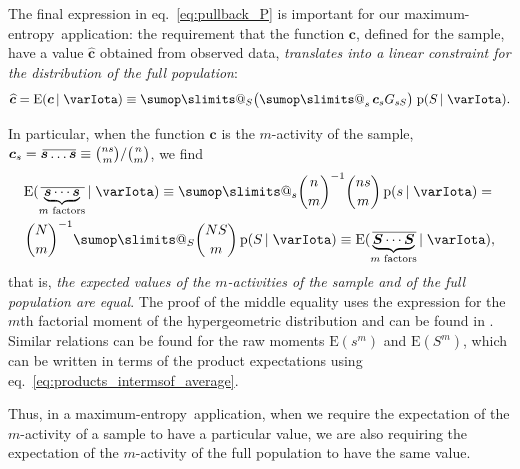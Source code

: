 \documentclass[\ifafour a4paper,12pt,\else a5paper,10pt,\fi%
onecolumn,oneside,article,%
british%
]{memoir}
\makeatletter
\theoremstyle{remark}
\theoremstyle{innote}
\def\sum{\DOTSI\sumop\slimits@}
\newcommand*{\pf}{\mathrm{p}}%
\newcommand*{\p}{\mathrm{P}}%
\newcommand*{\E}{\mathrm{E}}
\renewcommand*{\|}{\nonscript\,\vert\nonscript\;\mathopen{}}
\newcommand*{\eqn}{eq.}%
\newcommand*{\tsum}{\mathop{\textstyle\sum}\nolimits}
\newcommand*{\widebar}[1]{{\mkern1.5mu\skew{2}\overline{\mkern-1.5mu#1\mkern-1.5mu}\mkern 1.5mu}}
\newcommand*{\av}{\widebar} %
\newcommand*{\sav}{\widebar} %
\newcommand*{\ypp}{G}
\newcommand*{\yRv}{S}
\newcommand*{\yrv}{s}
\newcommand*{\yNv}{N}
\newcommand*{\yr}{\bm{\yrv}}%
\newcommand*{\yrs}{\yrv}%
\newcommand*{\yR}{\bm{\yRv}}%
\newcommand*{\yRf}{\yRv}%
\newcommand*{\yH}{\varIota}
\newcommand*{\yg}{\bm{c}}
\newcommand*{\yc}{\widehat{\bm{c}}}
\newcommand*{\me}{maximum-entropy}
\makeatother
\begin{document}
\bigskip

The final expression in \eqn~\eqref{eq:pullback_P} is important for our
\me\ application: the requirement that the function $\yg$, defined for the
sample, have a  value $\yc$ obtained from observed data,
\emph{translates into a linear constraint for the distribution of the full
  population}:
\begin{equation}
  \label{eq:constraint_extended}
  \yc = \E(\yg \| \yH) \equiv \sum_{\yRf} \bigl( \tsum_{\yrs} \yg_{\yrs}  \ypp_{\yrs\yRf} \bigr)\;
  \pf(\yRf \| \yH).
\end{equation}

In particular, when the function $\yg$ is the $m$-activity of the sample,
$\yg_{\yrs} = \sav{\yr\dotso\yr} \equiv \binom{n\yrs}{m}/\binom{n}{m}$, we
find
\begin{multline}
  \label{eq:expe_products}
  \E(\sav{\underbrace{\yr \dotsm \yr}_{\text{$m$ factors}}} \| \yH)
\equiv
    \sum_{\yrs} %
    \binom{n}{m}^{-1}
    \binom{n \yrs}{m}\, \pf(\yrs \| \yH)
    ={}\\
    \binom{\yNv}{m}^{-1}
    \sum_{\yRf} %
    \binom{\yNv \yRf}{m}\, \pf(\yRf \| \yH)
\equiv    \E(\av{\underbrace{\yR \dotsm \yR}_{\text{$m$ factors}}} \| \yH),
\end{multline}
that is, \emph{the expected values of the $m$-activities of the sample and
  of the full population are equal}. The proof of the middle equality uses
the expression for the $m$th factorial moment of the hypergeometric
distribution and can be found in \textcite{potts1953}. Similar relations
can be found for the raw moments $\E(\yrs^m)$ and $\E(\yRf^m)$, which
can be written in terms of the product expectations using
\eqn~\eqref{eq:products_intermsof_average}.

Thus, in a \me\ application, when we require the expectation of the
$m$-activity of a sample to have a particular value, we are also
requiring  the expectation of the $m$-activity of the full population to
have the same value.
\end{document}
